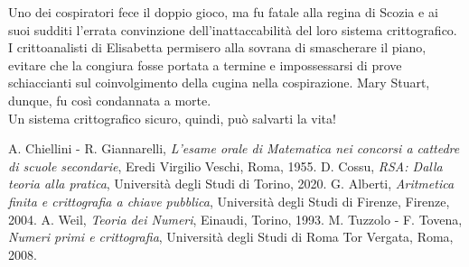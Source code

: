 \documentclass[a4paper,12pt]{article}
\begin{document}
Uno dei cospiratori fece il doppio gioco, ma fu fatale alla regina di Scozia e ai suoi sudditi l’errata convinzione dell'inattaccabilità del loro sistema crittografico.\\
I crittoanalisti di Elisabetta permisero alla sovrana di smascherare il piano, evitare che la congiura fosse portata a termine e impossessarsi di prove schiaccianti sul coinvolgimento della cugina nella cospirazione. Mary Stuart, dunque, fu così condannata a morte.\\
Un sistema crittografico sicuro, quindi, può salvarti la vita!
\begin{thebibliography}{99}
 A. Chiellini - R. Giannarelli, \emph{L'esame orale di Matematica nei concorsi a cattedre di scuole secondarie}, Eredi Virgilio Veschi, Roma, 1955.
 D. Cossu, \emph{RSA: Dalla teoria alla pratica}, Università degli Studi di Torino, 2020.
 G. Alberti, \emph{Aritmetica finita e crittografia a chiave pubblica}, Università degli Studi di Firenze, Firenze, 2004.
 A. Weil, \emph{Teoria dei Numeri}, Einaudi, Torino, 1993.
 M. Tuzzolo - F. Tovena, \emph{Numeri primi e crittografia}, Università degli Studi di Roma Tor Vergata, Roma, 2008.
\end{thebibliography}
\end{document}
